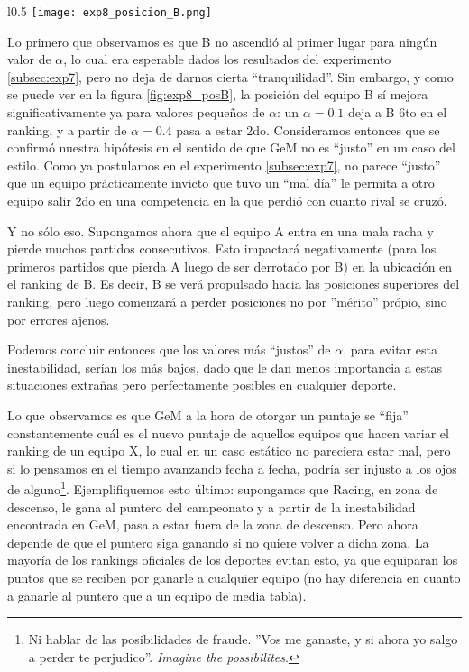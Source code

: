 \begin{wrapfigure}{l}{0.5\textwidth}
    \texttt{[image: exp8\_posicion\_B.png]}
    \caption{Posici\'on del equipo B en el ranking en funci\'on del factor
        $\alpha$ ($c=\alpha$)}
    \label{fig:exp8_posB}
\end{wrapfigure}
\noindent

\par Lo primero que observamos es que B no ascendió al primer lugar para ningún
valor de $\alpha$, lo cual era esperable dados los resultados del experimento
\ref{subsec:exp7}, pero no deja de darnos cierta ``tranquilidad''. Sin embargo,
y como se puede ver en la figura \ref{fig:exp8_posB}, la posición del equipo B
sí mejora significativamente ya para valores pequeños de $\alpha$: un $\alpha =
0.1$ deja a B 6to en el ranking, y a partir de $\alpha = 0.4$ pasa a estar 2do.
Consideramos entonces que se confirmó nuestra hipótesis en el sentido de que GeM
no es ``justo'' en un caso del estilo. Como ya postulamos en el experimento
\ref{subsec:exp7}, no parece ``justo'' que un equipo prácticamente invicto que
tuvo un ``mal día'' le permita a otro equipo salir 2do en una competencia en la
que perdió con cuanto rival se cruzó.

\par Y no s\'olo eso. Supongamos ahora que el equipo A entra en una mala racha
y pierde muchos partidos consecutivos. Esto impactar\'a negativamente (para los
primeros partidos que pierda A luego de ser derrotado por B) en la ubicaci\'on
en el ranking de B. Es decir, B se ver\'a propulsado hacia las posiciones
superiores del ranking, pero luego comenzar\'a a perder posiciones no por
''m\'erito'' pr\'opio, sino por errores ajenos.

\par Podemos concluir entonces que los valores más ``justos'' de $\alpha$, para
evitar esta inestabilidad, serían los más bajos, dado que le dan menos
importancia a estas situaciones extrañas pero perfectamente posibles en
cualquier deporte.

\par Lo que observamos es que GeM a la hora de otorgar un puntaje se ``fija''
constantemente cuál es el nuevo puntaje de aquellos equipos que hacen variar el
ranking de un equipo X, lo cual en un caso est\'atico no pareciera estar mal,
pero si lo pensamos en el tiempo avanzando fecha a fecha, podr\'ia ser injusto a
los ojos de alguno\footnote{Ni hablar de las posibilidades de fraude. ''Vos me
ganaste, y si ahora yo salgo a perder te perjudico''. \emph{Imagine the
possibilites}.}. Ejemplifiquemos esto \'ultimo: supongamos que Racing, en zona
de descenso, le gana al puntero del campeonato y a partir de la inestabilidad
encontrada en GeM, pasa a estar fuera de la zona de descenso. Pero ahora depende
de que el puntero siga ganando si no quiere volver a dicha zona. La mayor\'ia de
los rankings oficiales de los deportes evitan esto, ya que equiparan los puntos
que se reciben por ganarle a cualquier equipo (no hay diferencia en cuanto a
ganarle al puntero que a un equipo de media tabla).

